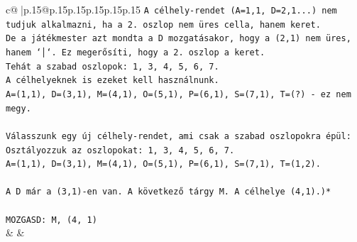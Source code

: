 \documentclass{article}
\begin{document}
{\begin{supertabular}{c@{$\;$}|p{.15\linewidth}@{}p{.15\linewidth}p{.15\linewidth}p{.15\linewidth}p{.15\linewidth}p{.15\linewidth}}
{{{\texttt{A célhely{-}rendet (A=1,1, D=2,1...) nem tudjuk alkalmazni, ha a 2. oszlop nem üres cella, hanem keret.} \\
\texttt{De a játékmester azt mondta a D mozgatásakor, hogy a (2,1) nem üres, hanem `│`. Ez megerősíti, hogy a 2. oszlop a keret.} \\
\texttt{Tehát a szabad oszlopok: 1, 3, 4, 5, 6, 7.} \\
\texttt{A célhelyeknek is ezeket kell használnunk.} \\
\texttt{A=(1,1), D=(3,1), M=(4,1), O=(5,1), P=(6,1), S=(7,1), T=(?) {-} ez nem megy.} \\
\\ 
\texttt{Válasszunk egy új célhely{-}rendet, ami csak a szabad oszlopokra épül:} \\
\texttt{Osztályozzuk az oszlopokat: 1, 3, 4, 5, 6, 7.} \\
\texttt{A=(1,1), D=(3,1), M=(4,1), O=(5,1), P=(6,1), S=(7,1), T=(1,2).} \\
\\ 
\texttt{A D már a (3,1){-}en van. A következő tárgy M. A célhelye (4,1).)*} \\
\\ 
\texttt{MOZGASD: M, (4, 1)} \\
            }
        }
    }
    & & \\ \\


\end{supertabular}}
\end{document}
